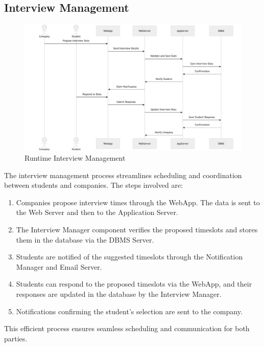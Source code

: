 \subsection{Interview Management}
\label{subsec:interview_management}
\begin{figure}[H]
    \begin{center}
        \includegraphics[width=0.82\linewidth]{JhaBhatiaSharma/imagesDD/InterviewManagementRuntime.png}
        \caption{Runtime Interview Management}
    \label{fig:interviewmanagementruntime}%
    \end{center}
\end{figure}

The interview management process streamlines scheduling and coordination between students and companies. The steps involved are:
\begin{enumerate}
    \item Companies propose interview times through the WebApp. The data is sent to the Web Server and then to the Application Server.
    \item The Interview Manager component verifies the proposed timeslots and stores them in the database via the DBMS Server.
    \item Students are notified of the suggested timeslots through the Notification Manager and Email Server.
    \item Students can respond to the proposed timeslots via the WebApp, and their responses are updated in the database by the Interview Manager.
    \item Notifications confirming the student's selection are sent to the company.
\end{enumerate}
This efficient process ensures seamless scheduling and communication for both parties.

